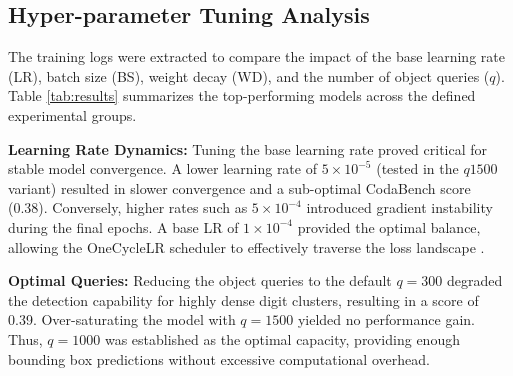 \documentclass[12pt, a4paper]{article}
\begin{document}
\subsection{Hyper-parameter Tuning Analysis}
The training logs were extracted to compare the impact of the base learning rate (LR), batch size (BS), weight decay (WD), and the number of object queries ($q$). Table \ref{tab:results} summarizes the top-performing models across the defined experimental groups.

\begin{table}[h]
\centering
\caption{Comparative performance of selected RT-DETRv2 configurations.}
\label{tab:results}
\end{table}

\textbf{Learning Rate Dynamics:} Tuning the base learning rate proved critical for stable model convergence. A lower learning rate of $5 \times 10^{-5}$ (tested in the $q1500$ variant) resulted in slower convergence and a sub-optimal CodaBench score (0.38). Conversely, higher rates such as $5 \times 10^{-4}$ introduced gradient instability during the final epochs. A base LR of $1 \times 10^{-4}$ provided the optimal balance, allowing the OneCycleLR scheduler to effectively traverse the loss landscape \cite{smith2019}.

\textbf{Optimal Queries:} Reducing the object queries to the default $q=300$ degraded the detection capability for highly dense digit clusters, resulting in a score of 0.39. Over-saturating the model with $q=1500$ yielded no performance gain. Thus, $q=1000$ was established as the optimal capacity, providing enough bounding box predictions without excessive computational overhead.
\end{document}

